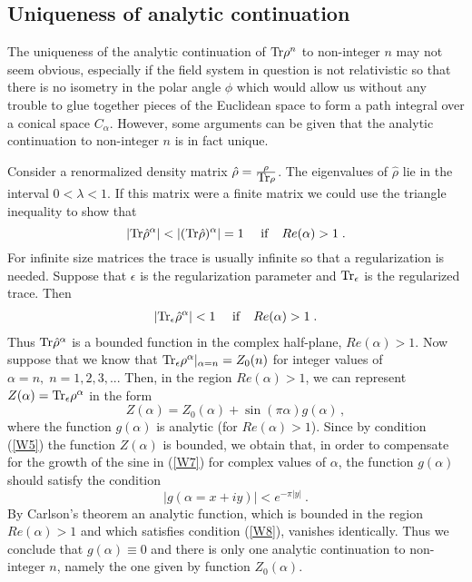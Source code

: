 \documentclass[12pt]{article}
\def\Tr{\hbox{Tr}}
\def\be{\begin{eqnarray}}
\def\ee{\end{eqnarray}}
\def\lb{\label}
\begin{document}
\subsection{Uniqueness of analytic continuation}
\label{section: analytic continuation}

The uniqueness of the analytic continuation of $\Tr \rho^n$ to
non-integer $n$ may not seem  obvious, especially if the field
system in question is not relativistic so that there is no
isometry in the polar angle $\phi$ which would allow us without
any trouble to glue together pieces of the Euclidean space to
form a   path integral  over a conical space $C_\alpha$. However,
some arguments can be  given that the analytic continuation to
non-integer $n$ is in fact unique. 

Consider a renormalized density matrix $\hat{\rho}=\frac{\rho}{ \Tr
\rho}$. The eigenvalues of $\hat{\rho}$ lie in the interval
$0<\lambda<1$. If this matrix were a  finite matrix we could use
the triangle inequality to show that
 \[ |\Tr \hat{\rho}^\alpha|<|(\Tr\hat{\rho})^\alpha|=1~
   \quad {\rm if}\quad Re(\alpha)>1\;. \]
For infinite size matrices  the trace is usually infinite so that
a regularization is needed.  Suppose that $\epsilon$
is the regularization parameter and $\Tr_\epsilon$ is the
regularized trace. Then
 \be
  |\Tr_\epsilon\hat{\rho}^\alpha|<1~\quad {\rm if}\quad Re(\alpha)>1\;.
 \lb{W5}
 \ee
Thus $\Tr\hat{\rho}^\alpha$ is a bounded function in
the complex half-plane, $Re(\alpha)>1$.  Now suppose that we know that $\Tr_\epsilon
\rho^\alpha|_{\alpha=n}=Z_0(n)$ for integer values of $\alpha=n,\;
n=1,2,3,..$. Then, in the region $Re(\alpha)>1$, we can represent
$Z(\alpha)=\Tr_\epsilon\rho^\alpha$ in the form
 \begin{equation} \lb{W7}
  Z(\alpha)=Z_0(\alpha)+\sin(\pi\alpha)g(\alpha) \,,
 \end{equation}
where the function $g(\alpha)$ is  analytic (for
$Re(\alpha)>1$). Since by condition (\ref{W5}) the function
$Z(\alpha)$ is bounded, we obtain that, in order
to compensate for the growth of the sine in (\ref{W7}) for complex
values of $\alpha$, the function $g(\alpha)$ should satisfy the
condition
 \begin{equation} \lb{W8}
  |g(\alpha=x+iy)|<e^{-\pi |y| }~.
 \end{equation}
By Carlson's theorem \cite{Carlson} an analytic function, which is   bounded in the region
$Re(\alpha)>1$ and  which satisfies condition (\ref{W8}),
vanishes identically. Thus we conclude that $g(\alpha)\equiv0$
and there is only one analytic continuation to
non-integer $n$, namely the one given by function $Z_0(\alpha)$.
\end{document}
